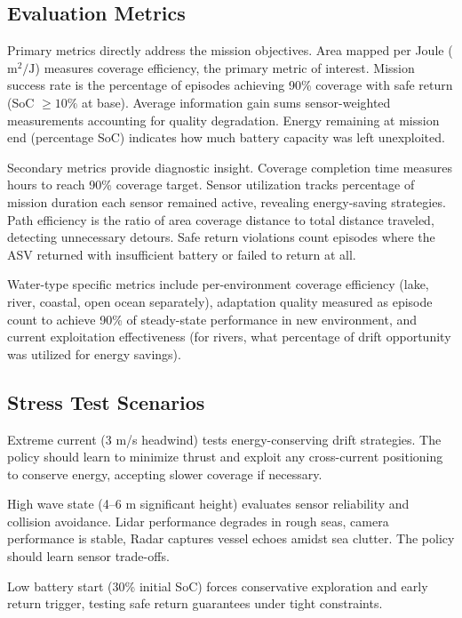 \subsection{Evaluation Metrics}

Primary metrics directly address the mission objectives. Area mapped per Joule ($\text{m}^2/\text{J}$) measures coverage efficiency, the primary metric of interest. Mission success rate is the percentage of episodes achieving 90\% coverage with safe return (SoC $\geq 10\%$ at base). Average information gain sums sensor-weighted measurements accounting for quality degradation. Energy remaining at mission end (percentage SoC) indicates how much battery capacity was left unexploited.

Secondary metrics provide diagnostic insight. Coverage completion time measures hours to reach 90\% coverage target. Sensor utilization tracks percentage of mission duration each sensor remained active, revealing energy-saving strategies. Path efficiency is the ratio of area coverage distance to total distance traveled, detecting unnecessary detours. Safe return violations count episodes where the ASV returned with insufficient battery or failed to return at all.

Water-type specific metrics include per-environment coverage efficiency (lake, river, coastal, open ocean separately), adaptation quality measured as episode count to achieve 90\% of steady-state performance in new environment, and current exploitation effectiveness (for rivers, what percentage of drift opportunity was utilized for energy savings).

\subsection{Stress Test Scenarios}

Extreme current (3 m/s headwind) tests energy-conserving drift strategies. The policy should learn to minimize thrust and exploit any cross-current positioning to conserve energy, accepting slower coverage if necessary.

High wave state (4--6 m significant height) evaluates sensor reliability and collision avoidance. Lidar performance degrades in rough seas, camera performance is stable, Radar captures vessel echoes amidst sea clutter. The policy should learn sensor trade-offs.

Low battery start (30\% initial SoC) forces conservative exploration and early return trigger, testing safe return guarantees under tight constraints.

